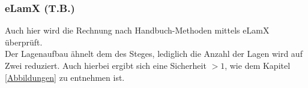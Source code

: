 \subsubsection{eLamX (T.B.)}

Auch hier wird die Rechnung nach Handbuch-Methoden mittels eLamX überprüft. \\

\noindent Der Lagenaufbau ähnelt dem des Steges, lediglich die Anzahl der Lagen wird auf Zwei reduziert. Auch hierbei ergibt sich eine Sicherheit $>1$, wie dem Kapitel \ref{Abbildungen} zu entnehmen ist.